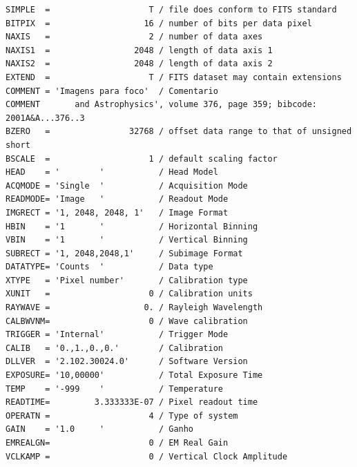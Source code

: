 \documentclass[
  letterpaper,
  DIV=11,
  numbers=noendperiod]{scrreprt}
\begin{document}
\begin{verbatim}
SIMPLE  =                    T / file does conform to FITS standard             
BITPIX  =                   16 / number of bits per data pixel                  
NAXIS   =                    2 / number of data axes                            
NAXIS1  =                 2048 / length of data axis 1                          
NAXIS2  =                 2048 / length of data axis 2                          
EXTEND  =                    T / FITS dataset may contain extensions            
COMMENT = 'Imagens para foco'  / Comentario                                     
COMMENT       and Astrophysics', volume 376, page 359; bibcode: 2001A&A...376..3
BZERO   =                32768 / offset data range to that of unsigned short    
BSCALE  =                    1 / default scaling factor                         
HEAD    = '        '           / Head Model                                     
ACQMODE = 'Single  '           / Acquisition Mode                               
READMODE= 'Image   '           / Readout Mode                                   
IMGRECT = '1, 2048, 2048, 1'   / Image Format                                   
HBIN    = '1       '           / Horizontal Binning                             
VBIN    = '1       '           / Vertical Binning                               
SUBRECT = '1, 2048,2048,1'     / Subimage Format                                
DATATYPE= 'Counts  '           / Data type                                      
XTYPE   = 'Pixel number'       / Calibration type                               
XUNIT   =                    0 / Calibration units                              
RAYWAVE =                   0. / Rayleigh Wavelength                            
CALBWVNM=                    0 / Wave calibration                               
TRIGGER = 'Internal'           / Trigger Mode                                   
CALIB   = '0.,1.,0.,0.'        / Calibration                                    
DLLVER  = '2.102.30024.0'      / Software Version                               
EXPOSURE= '10,00000'           / Total Exposure Time                            
TEMP    = '-999    '           / Temperature                                    
READTIME=         3.333333E-07 / Pixel readout time                             
OPERATN =                    4 / Type of system                                 
GAIN    = '1.0     '           / Ganho                                          
EMREALGN=                    0 / EM Real Gain                                   
VCLKAMP =                    0 / Vertical Clock Amplitude                       

\end{verbatim}
\end{document}
